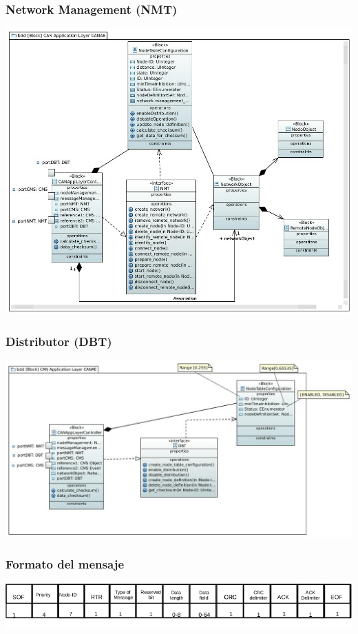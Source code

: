 \begin{frame}
	\frametitle{Network Management (NMT)}
	\centering
	\includegraphics[scale=0.25]{images/NMT.JPG}
\end{frame}

\begin{frame}
	\frametitle{Distributor (DBT)}
	\centering
	\includegraphics[scale=0.3]{images/DBT.JPG}
\end{frame}

\begin{frame}
	\frametitle{Formato del mensaje}
	\centering
	\includegraphics[scale=0.4]{images/Data_Frame.jpg}
\end{frame}

